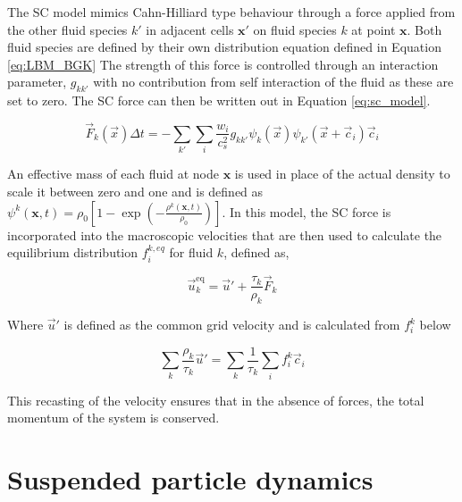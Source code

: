 The SC model mimics Cahn-Hilliard type behaviour through a force applied from the other fluid species $k'$ in adjacent 
cells $\mathbf{x'}$ on fluid species $k$ at point $\mathbf{x}$. \cite{shan_lattice_1993, shan_simulation_1994, 
shan_multicomponent_1995, he_discrete_1998, jansen_bijels_2011, chin_lattice_2002} Both fluid species are defined
 by their own distribution equation defined in Equation \ref{eq:LBM_BGK} The strength of this force is controlled 
 through an interaction parameter, $g_{kk'}$ with no contribution from self interaction of the fluid as these are 
 set to zero. The SC force can then be written out in Equation \ref{eq:sc_model}.

\begin{equation}
\vec{F}_k(\vec{x}) \Delta t = - \sum_{k'} \sum_i \frac{w_i}{c_s^2} g_{kk'} \psi_k(\vec{x})\psi_{k'}(\vec{x}+\vec{c}_i) \vec{c}_i
\label{eq:sc_model}
\end{equation}

An effective mass of each fluid at node $\mathbf{x}$ is used in place of the actual density to scale it between zero 
and one and is defined as $\psi^{k}(\mathbf{x},t) = \rho_{0}\left[1 - \exp(-\frac{\rho^{k}(\mathbf{x}, t)}{\rho_{0}})\right]$. 
In this model, the SC force is incorporated into the macroscopic velocities that are then used to calculate the equilibrium
distribution $f_{i}^{k, eq}$ for fluid $k$, defined as,

\begin{equation}
\vec{u}_k^{\text{eq}} = \vec{u}' + \frac{\tau_k}{\rho_k} \vec{F}_k
\end{equation}

Where $\vec{u}'$ is defined as the common grid velocity and is calculated from $f_i^k$ below

\begin{equation}
    \sum_k \frac{\rho_k}{\tau_k} \vec{u}' = \sum_k \frac{1}{\tau_k}\sum_i f_i^k\vec{c}_i
\end{equation}

This recasting of the velocity ensures that in the absence of forces, the total momentum of the system is conserved. 


\section{Suspended particle dynamics}
\label{section:lbm_colloids}

